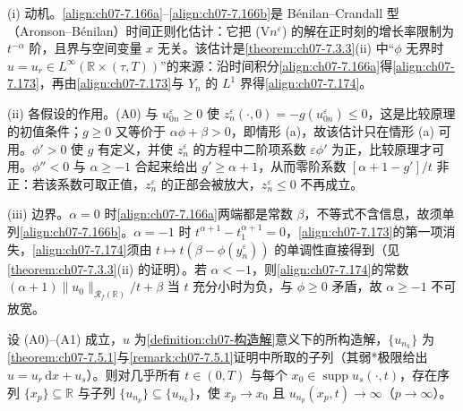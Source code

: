 \documentclass[../../main.tex]{subfiles}%
\begin{document}
\begin{remark}\label{remark:ch07-时间单调性}
(i) 动机。\eqref{align:ch07-7.166a}--\eqref{align:ch07-7.166b}是 Bénilan--Crandall 型（Aronson--Bénilan）时间正则化估计：它把 (V$n^\varepsilon$) 的解在正时刻的增长率限制为 $t^{-\alpha}$ 阶，且界与空间变量 $x$ 无关。该估计是\cref{theorem:ch07-7.3.3}(ii) 中“$\phi$ 无界时 $u=u_r\in L^\infty(\mathbb{R}\times(\tau,T))$”的来源：沿时间积分\eqref{align:ch07-7.166a}得\eqref{align:ch07-7.173}，再由\eqref{align:ch07-7.173}与 $Y_n$ 的 $L^1$ 界得\eqref{align:ch07-7.174}。

(ii) 各假设的作用。(A0) 与 $u_{0n}^\varepsilon\geqslant0$ 使 $z_n^\varepsilon(\cdot,0)=-g(u_{0n}^\varepsilon)\leqslant0$，这是比较原理的初值条件；$g\geqslant0$ 又等价于 $\alpha\phi+\beta>0$，即情形 (a)，故该估计只在情形 (a) 可用。$\phi'>0$ 使 $g$ 有定义，并使 $z_n^\varepsilon$ 的方程中二阶项系数 $\varepsilon\phi'$ 为正，比较原理才可用。$\phi''<0$ 与 $\alpha\geqslant-1$ 合起来给出 $g'\geqslant\alpha+1$，从而零阶系数 $[\alpha+1-g']/t$ 非正：若该系数可取正值，$z_n^\varepsilon$ 的正部会被放大，$z_n^\varepsilon\leqslant0$ 不再成立。

(iii) 边界。$\alpha=0$ 时\eqref{align:ch07-7.166a}两端都是常数 $\beta$，不等式不含信息，故须单列\eqref{align:ch07-7.166b}。$\alpha=-1$ 时 $t^{\alpha+1}-t_1^{\alpha+1}=0$，\eqref{align:ch07-7.173}的第一项消失，\eqref{align:ch07-7.174}须由 $t\mapsto t(\beta-\phi(y_n^\varepsilon))$ 的单调性直接得到（见\cref{theorem:ch07-7.3.3}(ii) 的证明）。若 $\alpha<-1$，则\eqref{align:ch07-7.174}的常数 $(\alpha+1)\|u_0\|_{\mathscr{R}_f(\mathbb{R})}/t+\beta$ 当 $t$ 充分小时为负，与 $\phi\geqslant0$ 矛盾，故 $\alpha\geqslant-1$ 不可放宽。
\end{remark}

\begin{lemma}\label{lemma:ch07-7.6.3}
设 (A0)--(A1) 成立，$u$ 为\cref{definition:ch07-构造解}意义下的所构造解，$\{u_{n_k}\}$ 为\cref{theorem:ch07-7.5.1}与\cref{remark:ch07-7.5.1}证明中所取的子列（其弱*极限给出 $u=u_r\,\mathrm{d}x+u_s$）。则对几乎所有 $t\in(0,T)$ 与每个 $x_0\in\operatorname{supp}u_s(\cdot,t)$，存在序列 $\{x_p\}\subseteq\mathbb{R}$ 与子列 $\{u_{n_p}\}\subseteq\{u_{n_k}\}$，使 $x_p\to x_0$ 且 $u_{n_p}(x_p,t)\to\infty$（$p\to\infty$）。
\end{lemma}
\end{document}

